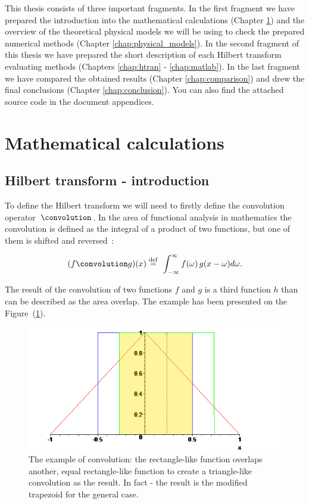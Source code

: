 \documentclass[12pt,twoside,a4paper]{article}
\numberwithin{equation}{subsection}
\numberwithin{figure}{subsection}
\begin{document}
This thesis consists of three important fragments. In the first fragment we have prepared the introduction into the mathematical calculations
(Chapter \ref{chap:mathematical_calculations}) and the overview of the theoretical physical models we will be using to check the
prepared numerical methods (Chapter \ref{chap:physical_models}). In the second fragment of this thesis we have prepared the short description of
each Hilbert transform evaluating methods (Chapters \ref{chap:htran} - \ref{chap:matlab}). In the last fragment we have compared the obtained
results (Chapter \ref{chap:comparison}) and drew the final conclusions (Chapter \ref{chap:conclusion}). You can also find the attached
source code in the document appendices.

\section{Mathematical calculations} \label{chap:mathematical_calculations}

\subsection{Hilbert transform - introduction}  \label{chap:mathematical_hilbert}

To define the Hilbert transform we will need to firstly define the convolution operator~$\convolution$. In the area of functional analysis
in mathematics the convolution is defined as the integral of a product of two functions, but one of them is shifted and
reversed~\cite{bracewell_fourier}:

\begin{equation} \label{eh:mth_convolution}
	(f \convolution g)(x) \stackrel{\mathrm{def}}{=}\  \int_{-\infty }^{\infty } f(\omega) \, g(x - \omega) d\omega .
\end{equation}
 
The result of the convolution of two functions $f$ and $g$ is a third function $h$ than can be described as the area overlap. The example
has been presented on the Figure~(\ref{fig:mathematical_convolution}).

\begin{figure} 
 \includegraphics{img/convolution.png}
 \caption{The example of convolution: the rectangle-like function overlaps another, equal rectangle-like function to create a
 triangle-like convolution as the result. In fact - the result is the modified trapezoid for the general case.
 \label{fig:mathematical_convolution}}
\end{figure}  
\end{document}
